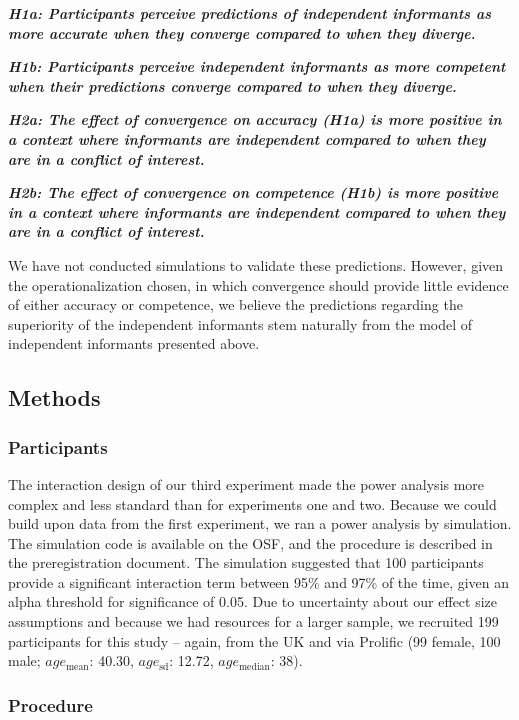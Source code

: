 \documentclass[
  doc,floatsintext]{apa6}
\begin{document}
\textbf{\emph{H1a: Participants perceive predictions of independent informants as more accurate when they converge compared to when they diverge.}}

\textbf{\emph{H1b: Participants perceive independent informants as more competent when their predictions converge compared to when they diverge.}}

\textbf{\emph{H2a: The effect of convergence on accuracy (H1a) is more positive in a context where informants are independent compared to when they are in a conflict of interest.}}

\textbf{\emph{H2b: The effect of convergence on competence (H1b) is more positive in a context where informants are independent compared to when they are in a conflict of interest.}}

We have not conducted simulations to validate these predictions. However, given the operationalization chosen, in which convergence should provide little evidence of either accuracy or competence, we believe the predictions regarding the superiority of the independent informants stem naturally from the model of independent informants presented above.

\subsection{Methods}\label{methods-2}

\subsubsection{Participants}\label{participants-2}

The interaction design of our third experiment made the power analysis more complex and less standard than for experiments one and two. Because we could build upon data from the first experiment, we ran a power analysis by simulation. The simulation code is available on the OSF, and the procedure is described in the preregistration document. The simulation suggested that 100 participants provide a significant interaction term between 95\% and 97\% of the time, given an alpha threshold for significance of 0.05. Due to uncertainty about our effect size assumptions and because we had resources for a larger sample, we recruited 199 participants for this study -- again, from the UK and via Prolific (99 female, 100 male; \(age_\text{mean}\): 40.30, \(age_\text{sd}\): 12.72, \(age_\text{median}\): 38).

\subsubsection{Procedure}\label{procedure-1}
\end{document}
